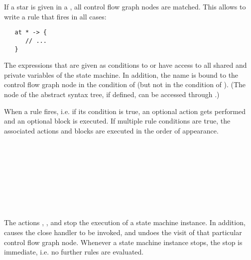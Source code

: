 \noindent
If a star is given in a , all
control flow graph nodes are matched. This allows to write a
rule that fires in all cases:

\begin{lstlisting}
   at * -> {
      // ...
   }
\end{lstlisting}

\noindent
The expressions that are given as conditions to
 or
 have access to all shared and
private variables of the state machine. In addition, the name
 is bound to the control flow graph node in the
condition of  (but not in the
condition of ). (The node
of the abstract syntax tree, if defined, can be accessed through
.)

When a rule fires, i.e. if its condition is true, an optional action
gets performed and an optional block is executed. If multiple rule
conditions are true, the associated actions and blocks are executed
in the order of appearance.

\begin{grammar}
      \produces {} \\
      \produces {} \\
      \produces {}  \\
      \produces {}
	 \lextoken{(}  \lextoken{)} \\
      \produces {} \\
      \produces {} \\
      \produces {} \\
      \produces {}
\end{grammar}

\noindent
The actions , , and  stop
the execution of a state machine instance. In addition, 
causes the close handler to be invoked, and  undoes the
visit of that particular control flow graph node. Whenever a state machine
instance stops, the stop is immediate, i.e. no further rules are
evaluated.

